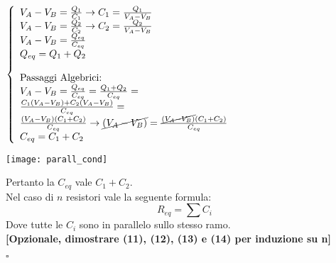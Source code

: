 \noindent\begin{minipage}{0.3\textwidth}
	$
	\left\{
	\begin{array}{lr}
	V_A - V_B = \frac{Q_1}{C_1} \rightarrow C_1 = \frac{Q_1}{V_A - V_B}   \\
	V_A - V_B = \frac{Q_2}{C_2}	\rightarrow C_2 = \frac{Q_2}{V_A - V_B}   \\
	V_A - V_B = \frac{Q_{eq}}{C_{eq}} \\
	Q_{eq} = Q_1 + Q_2\\
	\\
	\textnormal{Passaggi Algebrici:}\\
	V_A - V_B = \frac{Q_{eq}}{C_{eq}} = \frac{Q_1 + Q_2}{C_{eq}} = \\
	\frac{C_1(V_A - V_B) + C_2(V_A - V_B)}{C_{eq}} = \\
	\frac{(V_A - V_B)(C_1 + C_2)}{C_{eq}} \rightarrow \cancel{(V_A - V_B)} = \frac{\cancel{(V_A - V_B)}(C_1 + C_2)}{C_{eq}} \\
	C_{eq} = C_1 + C_2
	\end{array}
	\right.
	$
\end{minipage}
\hfill%
\begin{minipage}{0.6\textwidth}\raggedleft
	\texttt{[image: parall\_cond]}
\end{minipage}
Pertanto la $C_{eq}$ vale $C_1 + C_2$.\\
Nel caso di $n$ resistori vale la seguente formula:
\begin{equation}
    R_{eq} = \sum{C_i}
\end{equation}
Dove tutte le $C_i$ sono in parallelo sullo stesso ramo.\\
\textbf{[Opzionale, dimostrare (11), (12), (13) e (14) per induzione su n]}
\begin{flushright}
	$\square$
\end{flushright}
